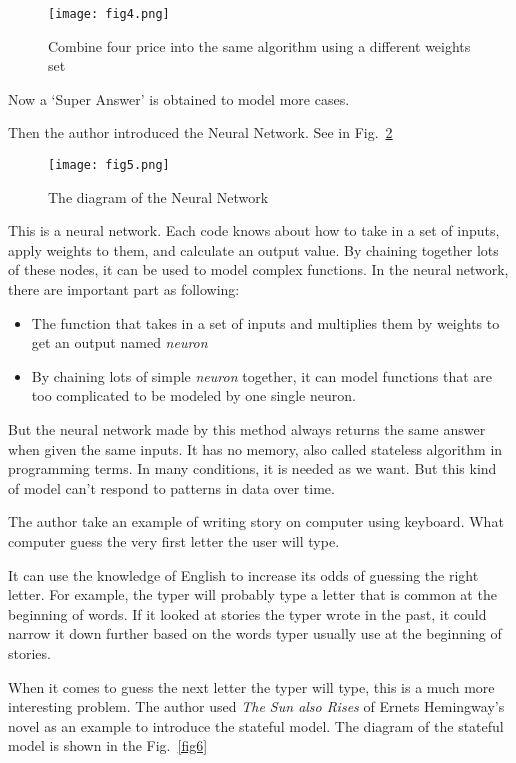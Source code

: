 \documentclass[10pt,twocolumn,letterpaper]{article}
\begin{document}
	\begin{figure}[h]
		\centering
		\texttt{[image: fig4.png]}
		\caption{Combine four price into the same algorithm using a different weights set} 
		\label{fig4}
	\end{figure}
	\par
	Now a `Super Answer' is obtained to model more cases.
	\par
	Then the author introduced the Neural Network. See in Fig.~\ref{fig5}
	\begin{figure}[h]
		\centering
		\texttt{[image: fig5.png]}
		\caption{The diagram of the Neural Network}\label{fig5}
	\end{figure}
	\par
	This is a neural network. Each code knows about how to take in a set of inputs, apply weights to them, and calculate an output value. By chaining together lots of these nodes, it can be used to model complex functions. In the neural network, there are important part as following:
	\begin{itemize}
		\item The function that takes in a set of inputs and multiplies them by weights to get an output named \emph{neuron}
		\item By chaining lots of simple \emph{neuron} together, it can model functions that are too complicated to be modeled by one single neuron.
	\end{itemize}
	\par
	But the neural network made by this method always returns the same answer when given the same inputs. It has no memory, also called stateless algorithm in programming terms. In many conditions, it is needed as we want. But this kind of model can't respond to patterns in data over time.
	\par
	The author take an example of writing story on computer using keyboard. What computer guess the very first letter the user will type.
	\par
	It can use the knowledge of English to increase its odds of guessing the right letter. For example, the typer will probably type a letter that is common at the beginning of words. If it looked at stories the typer wrote in the past, it could narrow it down further based on the words typer usually use at the beginning of stories.
	\par
	When it comes to guess the next letter the typer will type, this is a much more interesting problem. The author used \emph{The Sun also Rises} of Ernets Hemingway's novel as an example to introduce the stateful model. The diagram of the stateful model is shown in the Fig.~\ref{fig6}
\end{document}
